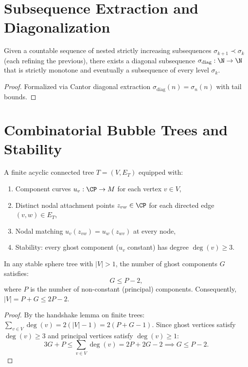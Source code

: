 \section{Subsequence Extraction and Diagonalization}

\begin{theorem}
\label{f05:subsequence_bookkeeping}
\leanok
{}
Given a countable sequence of nested strictly increasing subsequences $\sigma_{k+1} \prec \sigma_k$ (each refining the previous), there exists a diagonal subsequence $\sigma_{\mathrm{diag}} : \N \to \N$ that is strictly monotone and eventually a subsequence of every level $\sigma_k$.
\end{theorem}
\begin{proof}
\leanok
Formalized via Cantor diagonal extraction $\sigma_{\mathrm{diag}}(n) = \sigma_n(n)$ with tail bounds.
\end{proof}

\section{Combinatorial Bubble Trees and Stability}

\begin{definition}
\label{f06:sphere_tree}
\leanok
{}
A finite acyclic connected tree $T = (V, E_T)$ equipped with:
\begin{enumerate}
\item Component curves $u_v : \CP \to M$ for each vertex $v \in V$,
\item Distinct nodal attachment points $z_{vw} \in \CP$ for each directed edge $(v, w) \in E_T$,
\item Nodal matching $u_v(z_{vw}) = u_w(z_{wv})$ at every node,
\item Stability: every ghost component ($u_v$ constant) has degree $\operatorname{deg}(v) \ge 3$.
\end{enumerate}
\end{definition}

\begin{theorem}
\label{thm:ghost_components_bound}
\leanok
{}
In any stable sphere tree with $|V| > 1$, the number of ghost components $G$ satisfies:
\[
G \le P - 2,
\]
where $P$ is the number of non-constant (principal) components. Consequently, $|V| = P + G \le 2P - 2$.
\end{theorem}
\begin{proof}
\leanok
By the handshake lemma on finite trees: $\sum_{v \in V} \operatorname{deg}(v) = 2(|V| - 1) = 2(P + G - 1)$. Since ghost vertices satisfy $\operatorname{deg}(v) \ge 3$ and principal vertices satisfy $\operatorname{deg}(v) \ge 1$:
\[
3G + P \le \sum_{v \in V} \operatorname{deg}(v) = 2P + 2G - 2 \implies G \le P - 2.
\]
\end{proof}

